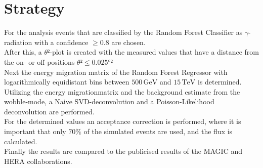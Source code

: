 \section{Strategy}
For the analysis events that are classified by the Random Forest Classifier as $\gamma$-radiation with a confidence $\geq 0.8$ are chosen. \\
After this, a $\theta²$-plot is created with the measured values that have a distance from the on- or off-positions $\theta² \leq 0.025°²$ \\
Next the energy migration matrix of the Random Forest Regressor with logarithmically equidistant bins between $500 \, \si{\giga\eV}$
and $15 \, \si{\tera\eV}$ is determined. Utilizing the energy migrationmatrix and the background estimate from the wobble-mode,
a Naive SVD-deconvolution and a Poisson-Likelihood deconvolution are performed.\\
For the determined values an acceptance correction is performed, where it is important that only $70 \%$ of the simulated events are used,
and the flux is calculated.\\
Finally the results are compared to the publicised results of the MAGIC and HERA collaborations.
